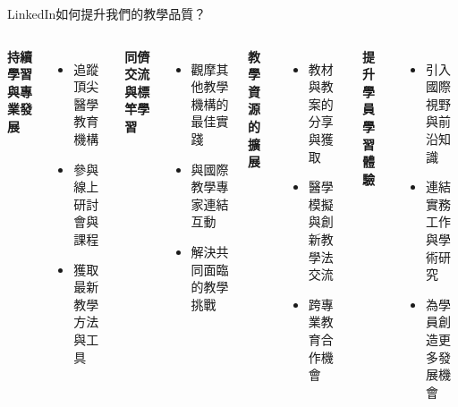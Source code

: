 \documentclass[aspectratio=169]{beamer}
\begin{document}
\begin{frame}{LinkedIn如何提升我們的教學品質？}
  \begin{columns}
    \textbf{持續學習與專業發展}
    \begin{itemize}
      \item 追蹤頂尖醫學教育機構
      \item 參與線上研討會與課程
      \item 獲取最新教學方法與工具
    \end{itemize}
    
    \textbf{同儕交流與標竿學習}
    \begin{itemize}
      \item 觀摩其他教學機構的最佳實踐
      \item 與國際教學專家連結互動
      \item 解決共同面臨的教學挑戰
    \end{itemize}
    
    \textbf{教學資源的擴展}
    \begin{itemize}
      \item 教材與教案的分享與獲取
      \item 醫學模擬與創新教學法交流
      \item 跨專業教育合作機會
    \end{itemize}
    
    \textbf{提升學員學習體驗}
    \begin{itemize}
      \item 引入國際視野與前沿知識
      \item 連結實務工作與學術研究
      \item 為學員創造更多發展機會
    \end{itemize}
  \end{columns}
\end{frame}
\end{document}
